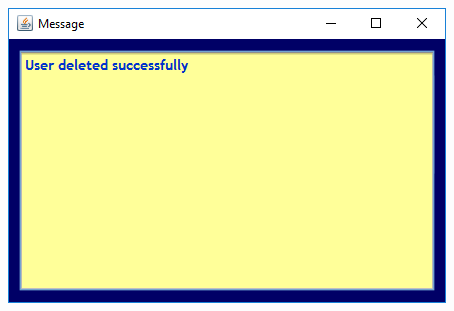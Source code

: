 \documentclass{article}
\begin{document}
\begin{enumerate}
\begin{itemize}
\includegraphics[scale=0.8]{images/LibrarianLogin/Actions/DeleteUser/UserDeleted.PNG}\\


\end{itemize}
\end{enumerate}
\end{document}
